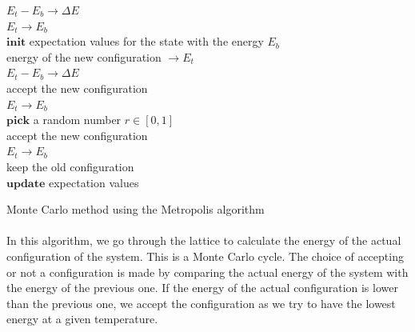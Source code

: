 \documentclass[a4paper, twoside, 11pt]{report}
\theoremstyle{theorem}
\theoremstyle{remark}
\theoremstyle{exemple}
\begin{document}
            \begin{center}
            \begin{algorithm}[H]
            
            \SetAlgoLined
            
                $E_t - E_b \rightarrow \Delta E$\\
		$E_t \rightarrow E_b$\\
		$\textbf{init}$ expectation values for the state with the energy $E_b$\\
		
                    {
                        energy of the new configuration $\rightarrow E_t$\\
		        $E_t - E_b \rightarrow \Delta E$\\
                        {
                            accept the new configuration\\                            
                            $E_t \rightarrow E_b$\\
                        }{
		            $\textbf{pick}$ a random number $r \in [0,1]$\\
                            {
                                accept the new configuration\\
                                $E_t \rightarrow E_b$\\
                            }{
                                keep the old configuration\\
                            }
                        }
                        $\textbf{update}$ expectation values\\
                    } 
                  
            \caption{Monte Carlo method using the Metropolis algorithm}  
            \end{algorithm}
            \end{center}
            
            \paragraph{}In this algorithm, we go through the lattice to calculate the energy of the actual configuration of the system. This is a Monte Carlo cycle. The choice of accepting or not a configuration is made by comparing the actual energy of the system with the energy of the previous one. If the energy of the actual configuration is lower than the previous one, we accept the configuration as we try to have the lowest energy at a given temperature.
            
\end{document}
